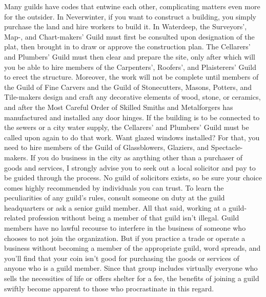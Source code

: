 \documentclass[10pt,a4paper,twoside,twocolumn,openany,nodeprecatedcode]{dndbook}
\begin{document}
Many guilds have codes that entwine each other, complicating matters even more for the outsider. In Neverwinter, if you want to construct a building, you simply purchase the land and hire workers to build it. In Waterdeep, the Surveyors', Map-, and Chart-makers' Guild must first be consulted upon designation of the plat, then brought in to draw or approve the construction plan. The Cellarers' and Plumbers' Guild must then clear and prepare the site, only after which will you be able to hire members of the Carpenters', Roofers', and Plaisterers' Guild to erect the structure.
Moreover, the work will not be complete until members of the Guild of Fine Carvers and the Guild of Stonecutters, Masons, Potters, and Tile-makers design and craft any decorative elements of wood, stone, or ceramics, and after the Most Careful Order of Skilled Smiths and Metalforgers has manufactured and installed any door hinges. If the building is to be connected to the sewers or a city water supply, the Cellarers' and Plumbers' Guild must be called upon again to do that work. Want glazed windows installed? For that, you need to hire members of the Guild of Glassblowers, Glaziers, and Spectacle-makers.
If you do business in the city as anything other than a purchaser of goods and services, I strongly advise you to seek out a local solicitor and pay to be guided through the process. No guild of solicitors exists, so be sure your choice comes highly recommended by individuals you can trust. To learn the peculiarities of any guild's rules, consult someone on duty at the guild headquarters or ask a senior guild member.
All that said, working at a guild-related profession without being a member of that guild isn't illegal. Guild members have no lawful recourse to interfere in the business of someone who chooses to not join the organization. But if you practice a trade or operate a business without becoming a member of the appropriate guild, word spreads, and you'll find that your coin isn't good for purchasing the goods or services of anyone who is a guild member. Since that group includes virtually everyone who sells the necessities of life or offers shelter for a fee, the benefits of joining a guild swiftly become apparent to those who procrastinate in this regard.
\end{document}
